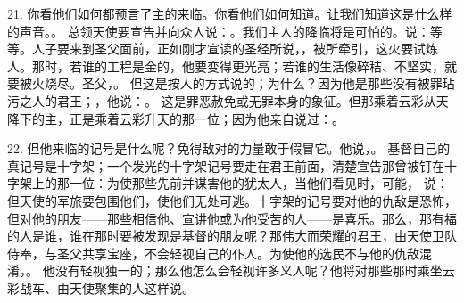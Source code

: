 21. 你看他们如何都预言了主的来临。你看他们如何知道。让我们知道这是什么样的声音。。 总领天使要宣告并向众人说：。我们主人的降临将是可怕的。说：等等。人子要来到圣父面前，正如刚才宣读的圣经所说，，被所牵引，这火要试炼人。那时，若谁的工程是金的，他要变得更光亮；若谁的生活像碎秸、不坚实，就要被火烧尽。圣父，。 但这是按人的方式说的；为什么？因为他是那些没有被罪玷污之人的君王；，他说：。 这是罪恶赦免或无罪本身的象征。但那乘着云彩从天降下的主，正是乘着云彩升天的那一位；因为他亲自说过：。\par

22. 但他来临的记号是什么呢？免得敌对的力量敢于假冒它。他说，。 基督自己的真记号是十字架；一个发光的十字架记号要走在君王前面，清楚宣告那曾被钉在十字架上的那一位：为使那些先前并谋害他的犹太人，当他们看见时，可能， 说：但天使的军旅要包围他们，使他们无处可逃。十字架的记号要对他的仇敌是恐怖，但对他的朋友——那些相信他、宣讲他或为他受苦的人——是喜乐。那么，那有福的人是谁，谁在那时要被发现是基督的朋友呢？那伟大而荣耀的君王，由天使卫队侍奉，与圣父共享宝座，不会轻视自己的仆人。为使他的选民不与他的仇敌混淆，。 他没有轻视独一的；那么他怎么会轻视许多义人呢？他将对那些那时乘坐云彩战车、由天使聚集的人这样说。\par

